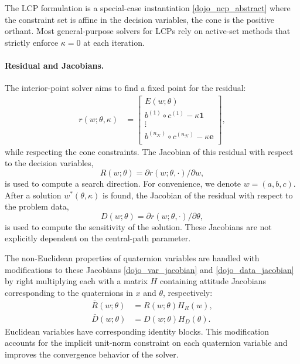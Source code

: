 The LCP formulation is a special-case instantiation \eqref{dojo_ncp_abstract} where the constraint set is affine in the decision variables, the cone is the positive orthant. Most general-purpose solvers for LCPs rely on active-set methods that strictly enforce $\kappa = 0$ at each iteration.

\paragraph{Residual and Jacobians.}
The interior-point solver aims to find a fixed point for the residual:
\begin{align}
	r(w; \theta, \kappa) &= \begin{bmatrix}
		E(w;\theta) \\
		b^{(1)} \circ c^{(1)} - \kappa \mathbf{1}\\
		\vdots \\
		b^{(n_{\mathcal{K}})} \circ c^{(n_{\mathcal{K}})} - \kappa \mathbf{e}\\
	\end{bmatrix}, \label{dojo_residual}
\end{align}
while respecting the cone constraints.
The Jacobian of this residual with respect to the decision variables,
\begin{equation}
	R(w; \theta) = \partial r(w; \theta, \cdot) / \partial w, \label{dojo_var_jacobian}
\end{equation}
is used to compute a search direction. For convenience, we denote $w = (a, b, c)$. After a solution $w^*(\theta, \kappa)$ is found, the Jacobian of the residual with respect to the problem data,
\begin{equation}
	D(w; \theta) = \partial r(w; \theta, \cdot) / \partial \theta , \label{dojo_data_jacobian}
\end{equation}
is used to compute the sensitivity of the solution. These Jacobians are not explicitly dependent on the central-path parameter.

The non-Euclidean properties of quaternion variables are handled with modifications to these Jacobians \eqref{dojo_var_jacobian} and \eqref{dojo_data_jacobian} by right multiplying each with a matrix $H$ containing attitude Jacobians \cite{jackson2021planning} corresponding to the quaternions in $x$ and $\theta$, respectively: 
\begin{align}
	\bar{R}(w; \theta) &= R(w; \theta) H_{R}(w), \\ 
	\bar{D}(w; \theta) &= D(w; \theta) H_{D}(\theta).
\end{align}
Euclidean variables have corresponding identity blocks. This modification accounts for the implicit unit-norm constraint on each quaternion variable and improves the convergence behavior of the solver.

